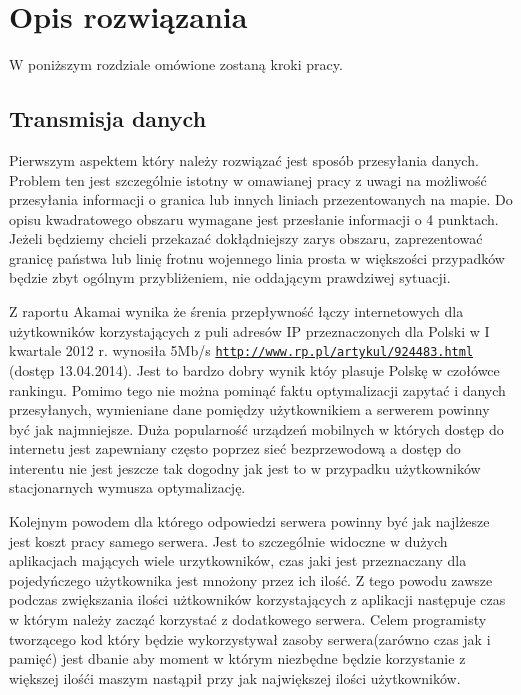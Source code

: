 \chapter{Opis rozwiązania}
\label{cha:Opis rozwiązania}

W poniższym rozdziale omówione zostaną kroki pracy.

\section{Transmisja danych}
\label{sec:transmisjaDanych}

Pierwszym aspektem który należy rozwiązać jest sposób przesyłania danych. Problem ten jest szczególnie istotny w omawianej pracy z uwagi na możliwość przesyłania informacji o granica lub innych liniach przezentowanych na mapie. Do opisu kwadratowego obszaru wymagane jest przesłanie informacji o 4 punktach. Jeżeli będziemy chcieli przekazać dokłądniejszy zarys obszaru, zaprezentować granicę państwa lub linię frotnu wojennego linia prosta w większości przypadków będzie zbyt ogólnym przybliżeniem, nie oddającym prawdziwej sytuacji.

Z raportu Akamai wynika że śrenia przepływność łączy internetowych dla użytkowników korzystających z puli adresów IP przeznaczonych dla Polski w I kwartale 2012 r. wynosiła 5Mb/s  \underline{\texttt{http://www.rp.pl/artykul/924483.html}} (dostęp 13.04.2014). Jest to bardzo dobry wynik któy plasuje Polskę w czołówce rankingu. Pomimo tego nie można pominąć faktu optymalizacji zapytać i danych przesyłanych, wymieniane dane pomiędzy użytkownikiem a serwerem powinny być jak najmniejsze. Duża popularność urządzeń mobilnych w których dostęp do internetu jest zapewniany często poprzez sieć bezprzewodową a dostęp do interentu nie jest jeszcze tak dogodny jak jest to w przypadku użytkowników stacjonarnych  wymusza optymalizację.

Kolejnym powodem dla którego odpowiedzi serwera powinny być jak najlżesze jest koszt pracy samego serwera. Jest to szczególnie widoczne w dużych aplikacjach mających wiele urzytkowników, czas jaki jest przeznaczany dla pojedyńczego użytkownika jest mnożony przez ich ilość. Z tego powodu zawsze podczas zwiększania ilości użtkowników korzystających z aplikacji następuje czas w którym należy zacząć korzystać z dodatkowego serwera. Celem programisty tworzącego kod który będzie wykorzystywał zasoby serwera(zarówno czas jak i pamięć) jest dbanie aby moment w którym niezbędne będzie korzystanie z większej ilośći maszym nastąpił przy jak największej ilości użytkowników.

